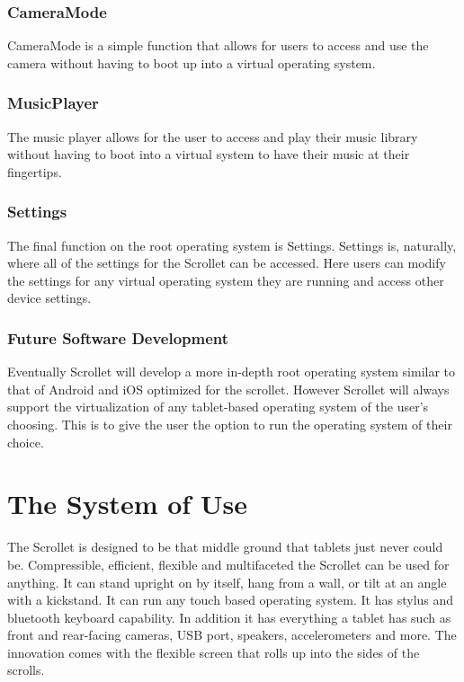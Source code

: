 \documentclass[a4paper]{article}
\begin{document}
\subsubsection{CameraMode}
CameraMode is a simple function that allows for users to access and use the camera without having to boot up into a virtual operating system.

\subsubsection{MusicPlayer}
The music player allows for the user to access and play their music library without having to boot into a virtual system to have their music at their fingertips.

\subsubsection{Settings}
The final function on the root operating system is Settings. Settings is, naturally, where all of the settings for the Scrollet can be accessed. Here users can modify the settings for any virtual operating system they are running and access other device settings.

\subsubsection{Future Software Development}
Eventually Scrollet will develop a more in-depth root operating system similar to that of Android and iOS optimized for the scrollet. However Scrollet will always support the virtualization of any tablet-based operating system of the user's choosing. This is to give the user the option to run the operating system of their choice.

\section{The System of Use}
\label{sec:system}
The Scrollet is designed to be that middle ground that tablets just never could be. Compressible, efficient, flexible and multifaceted the Scrollet can be used for anything. It can stand upright on by itself, hang from a wall, or tilt at an angle with a kickstand. It can run any touch based operating system. It has stylus and bluetooth keyboard capability. In addition it has everything a tablet has such as front and rear-facing cameras, USB port, speakers, accelerometers and more. The innovation comes with the flexible screen that rolls up into the sides of the scrolls.
\end{document}
